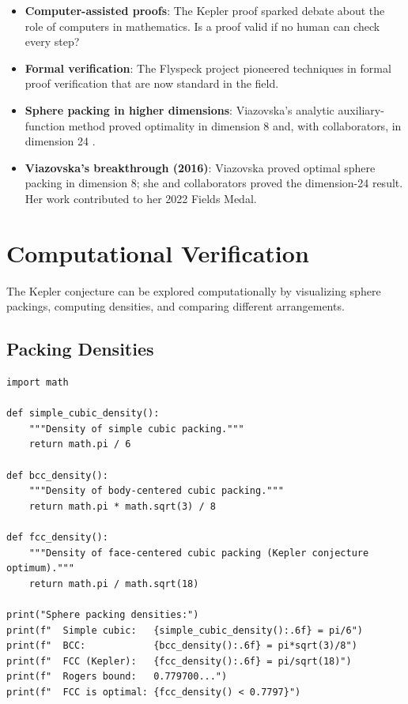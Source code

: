 \begin{itemize}
\item \textbf{Computer-assisted proofs}: The Kepler proof sparked debate about the role of computers in mathematics. Is a proof valid if no human can check every step?
\item \textbf{Formal verification}: The Flyspeck project pioneered techniques in formal proof verification that are now standard in the field.
\item \textbf{Sphere packing in higher dimensions}: Viazovska's analytic auxiliary-function method proved optimality in dimension 8 and, with collaborators, in dimension 24 \cite{viazovska2017,cohn2017}.
\item \textbf{Viazovska's breakthrough (2016)}: Viazovska proved optimal sphere packing in dimension 8; she and collaborators proved the dimension-24 result. Her work contributed to her 2022 Fields Medal.
\end{itemize}

\section{Computational Verification}

The Kepler conjecture can be explored computationally by visualizing sphere packings, computing densities, and comparing different arrangements.

\subsection{Packing Densities}

\begin{verbatim}
import math

def simple_cubic_density():
    """Density of simple cubic packing."""
    return math.pi / 6

def bcc_density():
    """Density of body-centered cubic packing."""
    return math.pi * math.sqrt(3) / 8

def fcc_density():
    """Density of face-centered cubic packing (Kepler conjecture optimum)."""
    return math.pi / math.sqrt(18)

print("Sphere packing densities:")
print(f"  Simple cubic:   {simple_cubic_density():.6f} = pi/6")
print(f"  BCC:            {bcc_density():.6f} = pi*sqrt(3)/8")
print(f"  FCC (Kepler):   {fcc_density():.6f} = pi/sqrt(18)")
print(f"  Rogers bound:   0.779700...")
print(f"  FCC is optimal: {fcc_density() < 0.7797}")
\end{verbatim}

